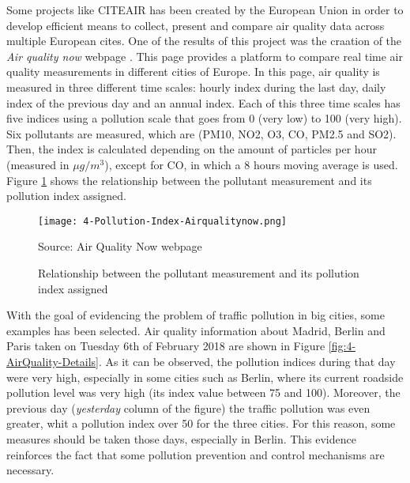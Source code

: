 Some projects like \ac{CITEAIR} has been created by the European Union \cite{citeair} in order to develop efficient means to collect, present and compare air quality data across multiple European cites. One of the results of this project was the craation of the \emph{Air quality now} webpage \cite{airqualitynow}. This page provides a platform to compare real time air quality measurements in different cities of Europe. In this page, air quality is measured in three different time scales: hourly index during the last day, daily index of the previous day and an annual index. Each of this three time scales has five indices using a pollution scale that goes from 0 (very low) to 100 (very high). Six pollutants are measured, which are (PM10, NO2, O3, CO, PM2.5 and SO2). Then, the index is calculated depending on the amount of particles per hour (measured in $\mu g/m^3$), except for CO, in which a 8 hours moving average is used. Figure \ref{fig:4-Pollution-Index-Airqualitynow} shows the relationship between the pollutant measurement and its pollution index assigned.

\begin{figure}[!h]
	\begin{center}
		\texttt{[image: 4-Pollution-Index-Airqualitynow.png]}	
		\caption{Relationship between the pollutant measurement and its pollution index assigned}{Source: Air Quality Now webpage \cite{airqualitynow}}
		\label{fig:4-Pollution-Index-Airqualitynow}
	\end{center}
\end{figure}

With the goal of evidencing the problem of traffic pollution in big cities, some examples has been selected. Air quality information about Madrid, Berlin and Paris taken on Tuesday 6th of February 2018 are shown in Figure \ref{fig:4-AirQuality-Details}.
As it can be observed, the pollution indices during that day were very high, especially in some cities such as Berlin, where its current roadside pollution level was very high (its index value between 75 and 100). Moreover, the previous day (\textit{yesterday} column of the figure) the traffic pollution was even greater, whit a pollution index over 50 for the three cities. For this reason, some measures should be taken those days, especially in Berlin. This evidence reinforces the fact that some pollution prevention and control mechanisms are necessary.

